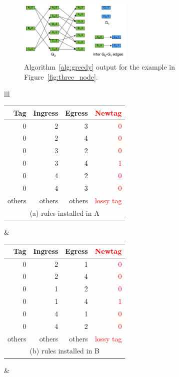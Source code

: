 \begin{figure}[t]
	\centering
	\includegraphics[width=0.48\textwidth] {figs/alo_walkthrough_c}
	\caption{Algorithm~\ref{alg:greedy} output for the example in Figure~\ref{fig:three_node}.}
	\label{fig:greedy}
	\vspace{-1em}
\end{figure}

\begin{table}[t]
	\footnotesize
	\centering
	\begin{tabular}{lll}
		\begin{tabular}{|r|r|r|r|}
			\hline
			Tag&  Ingress& Egress & \textcolor{red}{Newtag} \\
			\hline
			\hline
			0 & 2 & 3 & \textcolor{red}{0} \\
			\hline
			0 & 2 & 4 & \textcolor{red}{0} \\
			\hline
			0 & 3 & 2 & \textcolor{red}{0} \\
			\hline
			0 & 3 & 4 & \textcolor{red}{1} \\
			\hline
			0 & 4 & 2 & \textcolor{red}{0} \\
			\hline
			0 & 4 & 3 & \textcolor{red}{0} \\
			\hline
			others & others & others & \textcolor{red}{lossy tag} \\
			\hline
			\multicolumn{4}{c}{(a) rules installed in A} \\
		\end{tabular}
		&
		\begin{tabular}{|r|r|r|r|}
			\hline
			Tag&  Ingress& Egress & \textcolor{red}{Newtag} \\
			\hline
			\hline
			0 & 2 & 1 & \textcolor{red}{0} \\
			\hline
			0 & 2 & 4 & \textcolor{red}{0} \\
			\hline
			0 & 1 & 2 & \textcolor{red}{0} \\
			\hline
			0 & 1 & 4 & \textcolor{red}{1} \\
			\hline
			0 & 4 & 1 & \textcolor{red}{0} \\
			\hline
			0 & 4 & 2 & \textcolor{red}{0} \\
			\hline
			others & others & others & \textcolor{red}{lossy tag} \\
			\hline
			\multicolumn{4}{c}{(b) rules installed in B} \\
		\end{tabular}
		&
		

\end{tabular}
\end{table}
